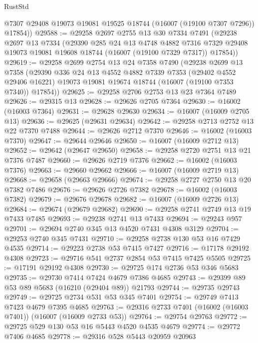 \begin{lexlean}{RustStd}
\begin{coremodule}
        @7307
        @29408
        @19073
        @19081
        @19525
        @18744
        (@16007 (@19100 @7307 @7296))
        @17854))
@29588 := @29258
    @2697
    @2755
    @13
    @30
    @7334
    @7491
    (@29238
      @2697
      @13
      @7334
      (@29390
        @285
        @24
        @13
        @4748
        @4882
        @7316
        @7329
        @29408
        @19073
        @19081
        @19608
        @18744
        (@16007 (@19100 @7329 @7317))
        @17854))
@29619 := @29258
    @2699
    @2754
    @13
    @24
    @7358
    @7490
    (@29238
      @2699
      @13
      @7358
      (@29390
        @336
        @24
        @13
        @4552
        @4882
        @7339
        @7353
        (@29402 @4552 @29406 @16221)
        @19073
        @19081
        @19674
        @18744
        (@16007 (@19100 @7353 @7340))
        @17854))
@29625 := @29258 @2706 @2753 @13 @23 @7364 @7489
@29626 := @29315 @13
@29628 := @29626 @2705 @7364
@29630 := @16002 (@16003 @7364)
@29631 := @29628 @29630
@29634 := @16007 (@16009 @2705 @13)
@29636 := @29625 (@29631 @29634)
@29642 := @29258 @2713 @2752 @13 @22 @7370 @7488
@29644 := @29626 @2712 @7370
@29646 := @16002 (@16003 @7370)
@29647 := @29644 @29646
@29650 := @16007 (@16009 @2712 @13)
@29652 := @29642 (@29647 @29650)
@29658 := @29258 @2720 @2751 @13 @21 @7376 @7487
@29660 := @29626 @2719 @7376
@29662 := @16002 (@16003 @7376)
@29663 := @29660 @29662
@29666 := @16007 (@16009 @2719 @13)
@29668 := @29658 (@29663 @29666)
@29674 := @29258 @2727 @2750 @13 @20 @7382 @7486
@29676 := @29626 @2726 @7382
@29678 := @16002 (@16003 @7382)
@29679 := @29676 @29678
@29682 := @16007 (@16009 @2726 @13)
@29684 := @29674 (@29679 @29682)
@29690 := @29258 @2741 @2749 @13 @19 @7433 @7485
@29693 := @29238 @2741 @13 @7433
@29694 := @29243 @957
@29701 := @29694 @2740 @345 @13 @4520 @7431 @4308 @3129
@29704 := @29253 @2740 @345 @7431
@29710 := @29258 @2738 @130 @53 @16 @7429 @4535
@29714 := @29223 @2738 @53 @7415 @7427
@29716 := @17178 @29192 @4308
@29723 := @29716 @541 @2737 @2854 @53 @7415 @7425 @5505
@29725 := @17191 @29192 @4308
@29730 := @29725 @174 @2736 @53 @346 @5683
@29735 := @29730 @7414 @7424 @4679 @7386 @4685
@29743 := @29399 @89 @53 @89 @5683 (@16210 (@29404 @89)) @21793
@29744 := @29735 @29743
@29749 := @29725 @2734 @531 @53 @345 @7401
@29754 := @29749 @7413 @7423 @4679 @7395 @4685
@29763 := @29316 @2733 @7401 (@16002 (@16003 @7401)) (@16007 (@16009 @2733 @53))
@29764 := @29754 @29763
@29772 := @29725 @529 @130 @53 @16 @5443 @4520 @4535 @4679
@29774 := @29772 @7406 @4685
@29778 := @29316 @528 @5443 @20959 @20963

\end{coremodule}
\end{lexlean}
